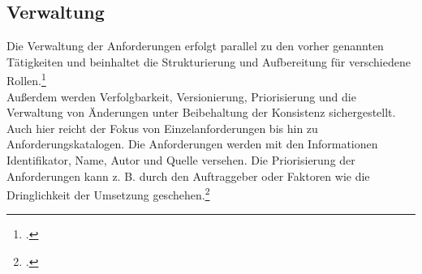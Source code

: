 
\subsection{Verwaltung}
Die Verwaltung der Anforderungen erfolgt parallel zu den vorher genannten Tätigkeiten und beinhaltet die Strukturierung und Aufbereitung für verschiedene Rollen.\footcite[Vgl.][S. 5]{Pohl_2015_Requirements}\\
Außerdem werden Verfolgbarkeit, Versionierung, Priorisierung und die Verwaltung von Änderungen unter Beibehaltung der Konsistenz sichergestellt. Auch hier reicht der Fokus von Einzelanforderungen bis hin zu Anforderungskatalogen.
Die Anforderungen werden mit den Informationen Identifikator, Name, Autor und Quelle versehen. Die Priorisierung der Anforderungen kann z. B. durch den Auftraggeber oder Faktoren wie die Dringlichkeit der Umsetzung geschehen.\footcite[Vgl.][S. 126]{Pohl_2015_Requirements}
